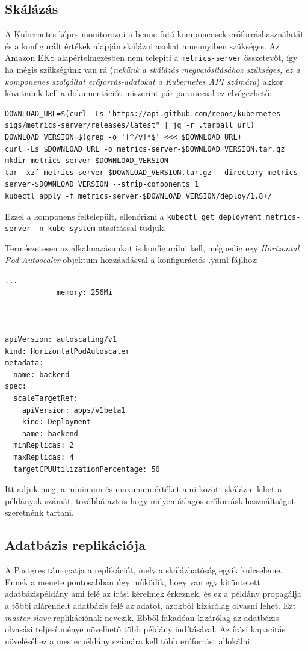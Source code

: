 \subsection{Skálázás}
A Kubernetes képes monitorozni a benne futó komponensek erőforráshasználatát és a konfigurált értékek alapján skálázni azokat amennyiben szükséges. Az Amazon EKS alapértelmezésben nem telepíti a \lstinline{metrics-server} összetevőt, így ha mégis szükségünk van rá (\textit{nekünk a skálázás megvalósításához szükséges, ez a komponenes szolgáltat erőforrás-adatokat a Kubernetes API számára}) akkor követnünk kell a dokumentációt\cite{metrics_eks} miszerint pár paranccsal ez elvégezhető:
\begin{lstlisting}
DOWNLOAD_URL=$(curl -Ls "https://api.github.com/repos/kubernetes-sigs/metrics-server/releases/latest" | jq -r .tarball_url)
DOWNLOAD_VERSION=$(grep -o '[^/v]*$' <<< $DOWNLOAD_URL)
curl -Ls $DOWNLOAD_URL -o metrics-server-$DOWNLOAD_VERSION.tar.gz
mkdir metrics-server-$DOWNLOAD_VERSION
tar -xzf metrics-server-$DOWNLOAD_VERSION.tar.gz --directory metrics-server-$DOWNLOAD_VERSION --strip-components 1
kubectl apply -f metrics-server-$DOWNLOAD_VERSION/deploy/1.8+/
\end{lstlisting}
Ezzel a komponens feltelepült, ellenőrizni a \lstinline{kubectl get deployment metrics-server -n kube-system} utasítással tudjuk.

Természetesen az alkalmazásunkat is konfigurálni kell, mégpedig egy \textit{Horizontal Pod Autoscaler} objektum hozzáadásval a konfigurációs .yaml fájlhoz:
\begin{lstlisting}
...
            memory: 256Mi

---

apiVersion: autoscaling/v1
kind: HorizontalPodAutoscaler
metadata:
  name: backend
spec:
  scaleTargetRef:
    apiVersion: apps/v1beta1
    kind: Deployment
    name: backend
  minReplicas: 2
  maxReplicas: 4
  targetCPUUtilizationPercentage: 50
\end{lstlisting}
Itt adjuk meg, a minimum és maximum értéket ami között skálázni lehet a példányok számát, továbbá azt is hogy milyen átlagos erőforráskihasználtságot szeretnénk tartani.
\subsection{Adatbázis replikációja}
A Postgres támogatja a replikációt, mely a skálázhatóság egyik kulcseleme. Ennek a menete pontosabban úgy működik, hogy van egy kitüntetett adatbázispéldány ami felé az írási kérelmek érkeznek, és ez a példány propagálja a többi alárendelt adatbázis felé az adatot, azokból kizárólag olvasni lehet. Ezt \textit{master-slave} replikációnak nevezik. Ebből fakadóan kizárólag az adatbázis olvasási teljesítménye növelhető több példány indításával. Az írási kapacitás növeléséhez a mesterpéldány számára kell több erőforrást allokálni.

